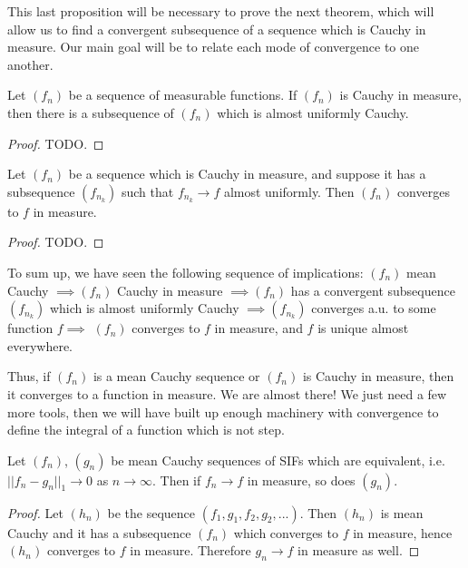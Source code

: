 	 This last proposition will be necessary to prove the next theorem, which will allow us to find a convergent subsequence 
	 of a sequence which is Cauchy in measure. Our main goal will be to relate each mode of convergence to one another. 
	 
	 \begin{theorem}
	 	Let $(f_n)$ be a sequence of measurable functions. If $(f_n)$ is Cauchy in measure, then there is a subsequence 
		of $(f_n)$ which is almost uniformly Cauchy.
	 \end{theorem}
	 
	 \begin{proof}
	 	TODO.
	 \end{proof}
	 
	 \begin{prop}
	 	Let $(f_n)$ be a sequence which is Cauchy in measure, and suppose it has a subsequence $(f_{n_k})$ such 
		that $f_{n_k}\rightarrow f$ almost uniformly. Then $(f_n)$ converges to $f$ in measure. 
	 \end{prop}
	 
	 \begin{proof}
	 	TODO.
	 \end{proof}
	 
	 To sum up, we have seen the following sequence of implications: $(f_n)$ mean Cauchy $\implies (f_n)$ Cauchy in 
	 measure $\implies (f_n)$ has a convergent subsequence $(f_{n_k})$ which is almost uniformly Cauchy $\implies 
	 (f_{n_k})$ converges a.u. to some function $f\implies$ $(f_n)$ converges to $f$ in measure, and $f$ is unique almost 
	 everywhere. 
	 
	 Thus, if $(f_n)$ is a mean Cauchy sequence or $(f_n)$ is Cauchy in measure, then it converges to a function in 
	 measure. We are almost there! We just need a few more tools, then we will have built up enough machinery with 
	 convergence to define the integral of a function which is not step. 
	 
	 \begin{prop}
	 	Let $(f_n)$, $(g_n)$ be mean Cauchy sequences of SIFs which are equivalent, i.e. $||f_n - g_n||_1\rightarrow 0$ as 
		$n\rightarrow\infty$. Then if $f_n\rightarrow f$ in measure, so does $(g_n)$. 
	 \end{prop}
	 
	 \begin{proof}
	 	Let $(h_n)$ be the sequence $(f_1, g_1, f_2, g_2, ...)$. Then $(h_n)$ is mean Cauchy and it has a subsequence 
		$(f_n)$ which converges to $f$ in measure, hence $(h_n)$ converges to $f$ in measure. Therefore $g_n\rightarrow 
		f$ in measure as well.
	 \end{proof}
	 

